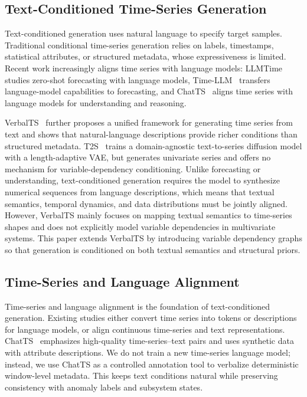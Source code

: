 \documentclass[conference]{IEEEtran}
\begin{document}
\subsection{Text-Conditioned Time-Series Generation}

Text-conditioned generation uses natural language to specify target samples. Traditional conditional time-series generation relies on labels, timestamps, statistical attributes, or structured metadata, whose expressiveness is limited. Recent work increasingly aligns time series with language models: LLMTime~\cite{gruver2023llmtime} studies zero-shot forecasting with language models, Time-LLM~\cite{jin2024timellm} transfers language-model capabilities to forecasting, and ChatTS~\cite{xie2025chatts} aligns time series with language models for understanding and reasoning.

VerbalTS~\cite{gu2025verbalts} further proposes a unified framework for generating time series from text and shows that natural-language descriptions provide richer conditions than structured metadata. T2S~\cite{ge2025t2s} trains a domain-agnostic text-to-series diffusion model with a length-adaptive VAE, but generates univariate series and offers no mechanism for variable-dependency conditioning. Unlike forecasting or understanding, text-conditioned generation requires the model to synthesize numerical sequences from language descriptions, which means that textual semantics, temporal dynamics, and data distributions must be jointly aligned. However, VerbalTS mainly focuses on mapping textual semantics to time-series shapes and does not explicitly model variable dependencies in multivariate systems. This paper extends VerbalTS by introducing variable dependency graphs so that generation is conditioned on both textual semantics and structural priors.

\subsection{Time-Series and Language Alignment}

Time-series and language alignment is the foundation of text-conditioned generation. Existing studies either convert time series into tokens or descriptions for language models, or align continuous time-series and text representations. ChatTS~\cite{xie2025chatts} emphasizes high-quality time-series--text pairs and uses synthetic data with attribute descriptions. We do not train a new time-series language model; instead, we use ChatTS as a controlled annotation tool to verbalize deterministic window-level metadata. This keeps text conditions natural while preserving consistency with anomaly labels and subsystem states.
\end{document}
